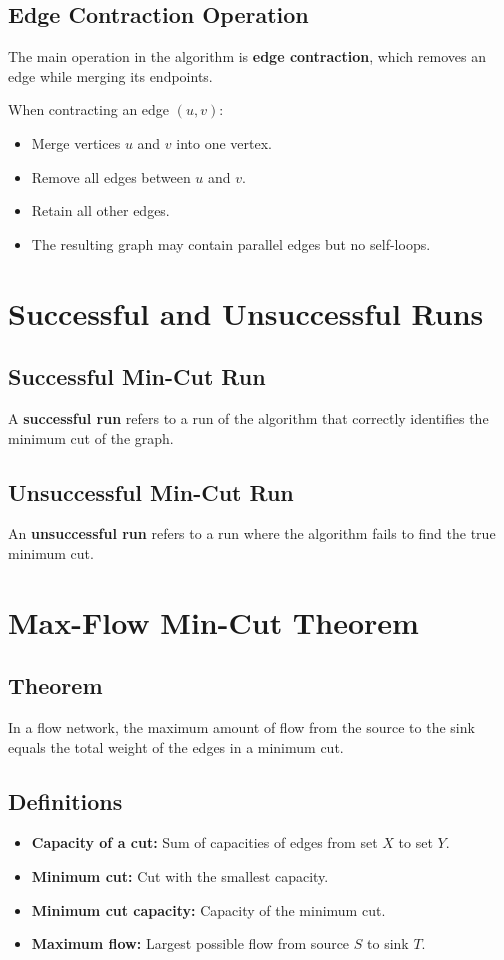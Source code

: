 \documentclass[12pt]{article}
\begin{document}
\subsection{Edge Contraction Operation}

The main operation in the algorithm is \textbf{edge contraction}, which removes an edge while merging its endpoints.

When contracting an edge $(u,v)$:
\begin{itemize}
    \item Merge vertices $u$ and $v$ into one vertex.
    \item Remove all edges between $u$ and $v$.
    \item Retain all other edges.
    \item The resulting graph may contain parallel edges but no self-loops.
\end{itemize}

\section{Successful and Unsuccessful Runs}

\subsection{Successful Min-Cut Run}
A \textbf{successful run} refers to a run of the algorithm that correctly identifies the minimum cut of the graph.

\subsection{Unsuccessful Min-Cut Run}
An \textbf{unsuccessful run} refers to a run where the algorithm fails to find the true minimum cut.

\section{Max-Flow Min-Cut Theorem}

\subsection*{Theorem}
In a flow network, the maximum amount of flow from the source to the sink equals the total weight of the edges in a minimum cut.

\subsection*{Definitions}
\begin{itemize}
    \item \textbf{Capacity of a cut:} Sum of capacities of edges from set $X$ to set $Y$.
    \item \textbf{Minimum cut:} Cut with the smallest capacity.
    \item \textbf{Minimum cut capacity:} Capacity of the minimum cut.
    \item \textbf{Maximum flow:} Largest possible flow from source $S$ to sink $T$.
\end{itemize}
\end{document}
